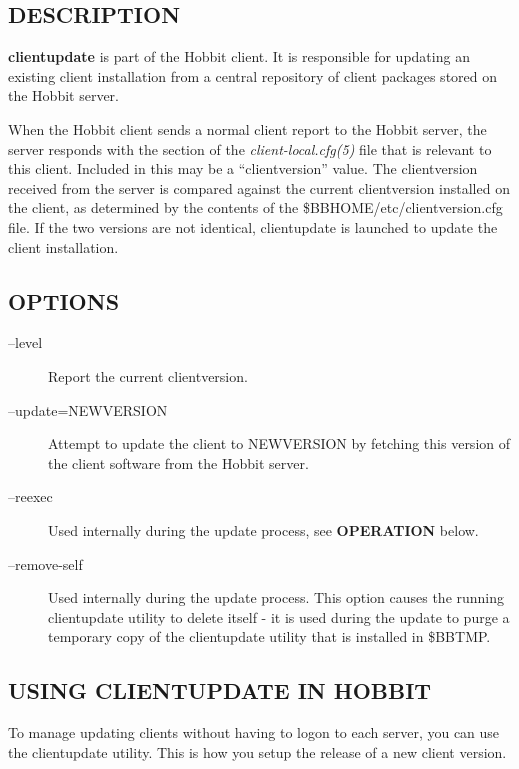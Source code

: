  
\subsection{DESCRIPTION}
\textbf{clientupdate}
 is part of the Hobbit client. It is responsible for updating an existing client installation from a central repository of client packages stored on the Hobbit server. 

  When the Hobbit client sends a normal client report to the Hobbit server, the server responds with the section of the \emph{client-local.cfg(5)}
 file that is relevant to this client. Included in this may be a ``clientversion'' value. The clientversion received from the server is compared against the current clientversion installed on the client, as determined by the contents of the \$BBHOME/etc/clientversion.cfg file. If the two versions are not identical, clientupdate is launched to update the client installation. 


 
\subsection{OPTIONS}
\begin{description}
\item[--level] Report the current clientversion. 

 

\item[--update=NEWVERSION] Attempt to update the client to NEWVERSION by fetching this version of the client software from the Hobbit server. 

 

\item[--reexec] Used internally during the update process, see \textbf{OPERATION}
 below. 

 

\item[--remove-self] Used internally during the update process. This option causes the running clientupdate utility to delete itself - it is used during the update to purge a temporary copy of the clientupdate utility that is installed in \$BBTMP. 

 


\end{description}
\subsection{USING CLIENTUPDATE IN HOBBIT}
 To manage updating clients without having to logon to each server, you can use the clientupdate utility. This is how you setup the release of a new client version. 

